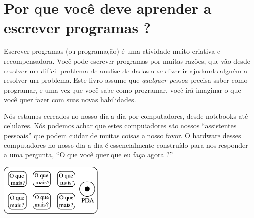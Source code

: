 
\chapter{Por que você deve aprender a escrever programas ?}

Escrever programas (ou programação) é uma atividade
muito criativa e recompensadora. Você pode escrever programas por
muitas razões, que vão desde resolver um difícil problema de 
análise de dados a se divertir ajudando alguém a resolver um
problema. Este livro assume que \emph{qualquer pessoa} precisa
saber como programar, e uma vez que você sabe como programar,
você irá imaginar o que você quer fazer com suas novas habilidades.

Nós estamos cercados no nosso dia a dia por computadores, desde
notebooks até celulares. Nós podemos achar que estes computadores
são nossos ``assistentes pessoais'' que podem cuidar de muitas coisas
a nosso favor. O hardware desses computadores no nosso dia a dia é
essencialmente construído para nos responder a uma pergunta,
``O que você quer que eu faça agora ?''

\beforefig
\centerline{\includegraphics[height=1.00in]{figs2/pda.eps}}
\afterfig

